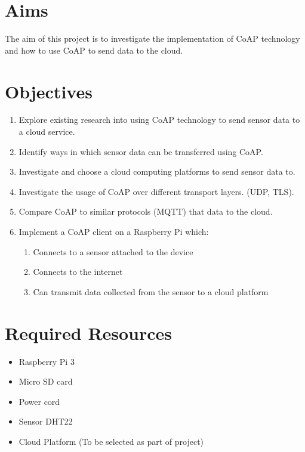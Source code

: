 \documentclass{article}
\begin{document}
	\section{Aims}
	The aim of this project is to investigate the implementation of CoAP technology and how to use CoAP to send data to the cloud.

	\section{Objectives}
	\begin{enumerate}
	\item Explore existing research into using CoAP technology to send sensor data to a cloud service.
	\item Identify ways in which sensor data can be transferred using CoAP.
	\item Investigate and choose a cloud computing platforms to send sensor data to.
	\item Investigate the usage of CoAP over different transport layers. (UDP, TLS).
	\item Compare CoAP to similar protocols (MQTT) that data to the cloud.
	\item Implement a CoAP client on a Raspberry Pi which:
		\begin{enumerate}
			\item Connects to a sensor attached to the device
			\item Connects to the internet
			\item Can transmit data collected from the sensor to a cloud platform
		\end{enumerate}
	\end{enumerate}

	\section{Required Resources}
	\begin{itemize}
		\item Raspberry Pi 3
		\item Micro SD card
		\item Power cord
		\item Sensor DHT22
		\item Cloud Platform (To be selected as part of project)
	\end{itemize}
	
\end{document}
